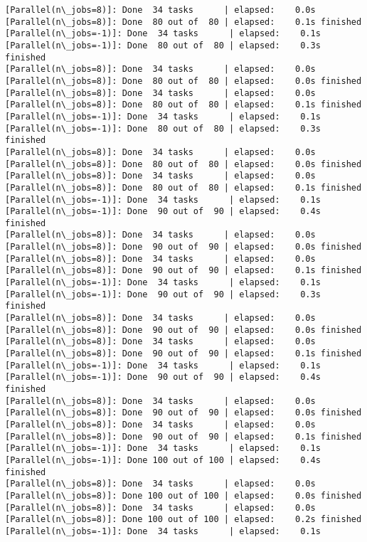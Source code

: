 \documentclass[11pt]{article}
\begin{document}
\begin{Verbatim}[commandchars=\\\{\}]
[Parallel(n\_jobs=8)]: Done  34 tasks      | elapsed:    0.0s
[Parallel(n\_jobs=8)]: Done  80 out of  80 | elapsed:    0.1s finished
[Parallel(n\_jobs=-1)]: Done  34 tasks      | elapsed:    0.1s
[Parallel(n\_jobs=-1)]: Done  80 out of  80 | elapsed:    0.3s finished
[Parallel(n\_jobs=8)]: Done  34 tasks      | elapsed:    0.0s
[Parallel(n\_jobs=8)]: Done  80 out of  80 | elapsed:    0.0s finished
[Parallel(n\_jobs=8)]: Done  34 tasks      | elapsed:    0.0s
[Parallel(n\_jobs=8)]: Done  80 out of  80 | elapsed:    0.1s finished
[Parallel(n\_jobs=-1)]: Done  34 tasks      | elapsed:    0.1s
[Parallel(n\_jobs=-1)]: Done  80 out of  80 | elapsed:    0.3s finished
[Parallel(n\_jobs=8)]: Done  34 tasks      | elapsed:    0.0s
[Parallel(n\_jobs=8)]: Done  80 out of  80 | elapsed:    0.0s finished
[Parallel(n\_jobs=8)]: Done  34 tasks      | elapsed:    0.0s
[Parallel(n\_jobs=8)]: Done  80 out of  80 | elapsed:    0.1s finished
[Parallel(n\_jobs=-1)]: Done  34 tasks      | elapsed:    0.1s
[Parallel(n\_jobs=-1)]: Done  90 out of  90 | elapsed:    0.4s finished
[Parallel(n\_jobs=8)]: Done  34 tasks      | elapsed:    0.0s
[Parallel(n\_jobs=8)]: Done  90 out of  90 | elapsed:    0.0s finished
[Parallel(n\_jobs=8)]: Done  34 tasks      | elapsed:    0.0s
[Parallel(n\_jobs=8)]: Done  90 out of  90 | elapsed:    0.1s finished
[Parallel(n\_jobs=-1)]: Done  34 tasks      | elapsed:    0.1s
[Parallel(n\_jobs=-1)]: Done  90 out of  90 | elapsed:    0.3s finished
[Parallel(n\_jobs=8)]: Done  34 tasks      | elapsed:    0.0s
[Parallel(n\_jobs=8)]: Done  90 out of  90 | elapsed:    0.0s finished
[Parallel(n\_jobs=8)]: Done  34 tasks      | elapsed:    0.0s
[Parallel(n\_jobs=8)]: Done  90 out of  90 | elapsed:    0.1s finished
[Parallel(n\_jobs=-1)]: Done  34 tasks      | elapsed:    0.1s
[Parallel(n\_jobs=-1)]: Done  90 out of  90 | elapsed:    0.4s finished
[Parallel(n\_jobs=8)]: Done  34 tasks      | elapsed:    0.0s
[Parallel(n\_jobs=8)]: Done  90 out of  90 | elapsed:    0.0s finished
[Parallel(n\_jobs=8)]: Done  34 tasks      | elapsed:    0.0s
[Parallel(n\_jobs=8)]: Done  90 out of  90 | elapsed:    0.1s finished
[Parallel(n\_jobs=-1)]: Done  34 tasks      | elapsed:    0.1s
[Parallel(n\_jobs=-1)]: Done 100 out of 100 | elapsed:    0.4s finished
[Parallel(n\_jobs=8)]: Done  34 tasks      | elapsed:    0.0s
[Parallel(n\_jobs=8)]: Done 100 out of 100 | elapsed:    0.0s finished
[Parallel(n\_jobs=8)]: Done  34 tasks      | elapsed:    0.0s
[Parallel(n\_jobs=8)]: Done 100 out of 100 | elapsed:    0.2s finished
[Parallel(n\_jobs=-1)]: Done  34 tasks      | elapsed:    0.1s

\end{Verbatim}
\end{document}
